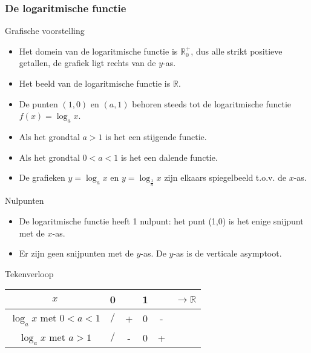 \subsubsection{De logaritmische functie}

Grafische voorstelling


\begin{figure}[H]
\centering

\end{figure}


\begin{itemize}
	\item Het domein van de logaritmische functie is $\mathbb{R}_{0}^{+}$,
	dus alle strikt positieve getallen, de grafiek ligt rechts van de
	$y$-as.
	\item Het beeld van de logaritmische functie is $\mathbb{R}$.
	\item De punten $(1,0)$ en $(a,1)$ behoren steeds tot de logaritmische
	functie $f(x)=\log_{a}x$.
	\item Als het grondtal $a>1$ is het een stijgende functie.
	\item Als het grondtal $0<a<1$ is het een dalende functie.
	\item De grafieken $y=\log_{a}x$ en $y=\log_{\frac{1}{a}}x$
	zijn elkaars spiegelbeeld t.o.v. de $x$-as.
\end{itemize}

Nulpunten

\begin{itemize}
	\item De logaritmische functie heeft 1 nulpunt: het punt (1,0) is het enige
	snijpunt met de $x$-as. 
	\item Er zijn geen snijpunten met de $y$-as. De $y$-as is de verticale asymptoot.
\end{itemize}

Tekenverloop

\begin{tabel}{}
\begin{tabular}{c|ccccc}
	$x$ & 0 &  & 1 &  & $\longrightarrow\mathbb{R}$\\
	\hline 
	$\log_{a}x$ met $0<a<1$ & $/$ & + & 0 & - & \multicolumn{1}{c|}{}\\
	$\log_{a}x$ met $a>1$ & $/$ & - & 0 & + & \multicolumn{1}{c|}{}\\
\end{tabular}
\end{tabel}


